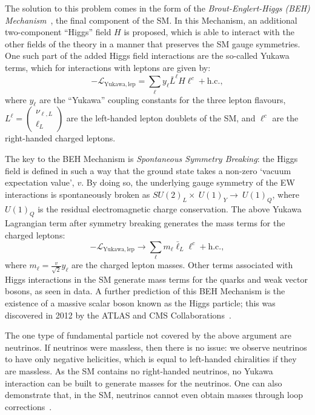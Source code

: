 The solution to this problem comes in the form of the \textit{Brout-Englert-Higgs (BEH) Mechanism}~\cite{englertBrokenSymmetryMass1964,higgsBrokenSymmetriesMasses1964,guralnikGlobalConservationLaws1964}, %
the final component of the SM.  In this Mechanism, an additional two-component ``Higgs'' field $H$ is proposed, which is able to interact with the other fields of the theory in a manner that preserves the SM gauge symmetries. One such part of the added Higgs field interactions are the so-called Yukawa terms, which for interactions with leptons are given by:
\begin{equation}\label{eq:SM_yukawa_leptons}
    -\mathcal{L}_{\mathrm{Yukawa,lep}} = \sum_{\ell}y_{\ell}\bar{L}^{\ell}H\ell^{c} + \mathrm{h.c.},
\end{equation}
where $y_{\ell}$ are the ``Yukawa'' coupling constants for the three lepton flavours, $L^{\ell} = \begin{pmatrix}
    \nu_{\ell,L} \\ \ell_{L}
\end{pmatrix}$ are the left-handed lepton doublets of the SM, and $\ell^{c}$ are the right-handed charged leptons.

The key to the BEH Mechanism is \textit{Spontaneous Symmetry Breaking}: the Higgs field is defined in such a way that the ground state takes a non-zero `vacuum expectation value', $v$. By doing so, the underlying gauge symmetry of the EW interactions is spontaneously broken as $SU(2)_{L}\times~U(1)_{Y}\to~U(1)_{Q}$, where $U(1)_{Q}$ is the residual electromagnetic charge conservation. The above Yukawa Lagrangian term after symmetry breaking generates the mass terms for the charged leptons:
\begin{equation}
    -\mathcal{L}_{\mathrm{Yukawa,lep}} \to \sum_{\ell}m_{\ell}\bar{\ell}_{L}\ell^{c} + \mathrm{h.c.},
\end{equation}
where $m_{\ell} = \frac{v}{\sqrt{2}}y_{\ell}$ are the charged lepton masses. Other terms associated with Higgs interactions in the SM generate mass terms for the quarks and weak vector bosons, as seen in data. A further prediction of this BEH Mechanism is the existence of a massive scalar boson known as the Higgs particle; this was discovered in 2012 by the ATLAS and CMS Collaborations~\cite{aadObservationNewParticle2012,chatrchyanObservationNewBoson2012}. %

The one type of fundamental particle not covered by the above argument are neutrinos. If neutrinos were massless, then there is no issue: we observe neutrinos to have only negative helicities, which is equal to left-handed chiralities if they are massless. As the SM contains no right-handed neutrinos, no Yukawa interaction can be built to generate masses for the neutrinos. One can also demonstrate that, in the SM, neutrinos cannot even obtain masses through loop corrections~\cite{workmanReviewParticlePhysics2022}. %

